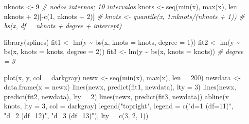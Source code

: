\documentclass[
]{book}
\newenvironment{Shaded}{\begin{snugshade}}{\end{snugshade}}
\newcommand{\AttributeTok}[1]{\textcolor[rgb]{0.77,0.63,0.00}{#1}}
\newcommand{\CommentTok}[1]{\textcolor[rgb]{0.56,0.35,0.01}{\textit{#1}}}
\newcommand{\DecValTok}[1]{\textcolor[rgb]{0.00,0.00,0.81}{#1}}
\newcommand{\FunctionTok}[1]{\textcolor[rgb]{0.00,0.00,0.00}{#1}}
\newcommand{\NormalTok}[1]{#1}
\newcommand{\OtherTok}[1]{\textcolor[rgb]{0.56,0.35,0.01}{#1}}
\newcommand{\SpecialCharTok}[1]{\textcolor[rgb]{0.00,0.00,0.00}{#1}}
\newcommand{\StringTok}[1]{\textcolor[rgb]{0.31,0.60,0.02}{#1}}
\theoremstyle{break}
\theoremstyle{definition}
\theoremstyle{definition}
\theoremstyle{definition}
\theoremstyle{definition}
\theoremstyle{remark}
\begin{document}
\begin{Shaded}
\begin{Highlighting}[]
\NormalTok{nknots }\OtherTok{\textless{}{-}} \DecValTok{9} \CommentTok{\# nodos internos; 10 intervalos}
\NormalTok{knots }\OtherTok{\textless{}{-}} \FunctionTok{seq}\NormalTok{(}\FunctionTok{min}\NormalTok{(x), }\FunctionTok{max}\NormalTok{(x), }\AttributeTok{len =}\NormalTok{ nknots }\SpecialCharTok{+} \DecValTok{2}\NormalTok{)[}\SpecialCharTok{{-}}\FunctionTok{c}\NormalTok{(}\DecValTok{1}\NormalTok{, nknots }\SpecialCharTok{+} \DecValTok{2}\NormalTok{)]}
\CommentTok{\# knots \textless{}{-} quantile(x, 1:nknots/(nknots + 1)) \# bs(x, df = nknots + degree + intercept)}

\FunctionTok{library}\NormalTok{(splines)}
\NormalTok{fit1 }\OtherTok{\textless{}{-}} \FunctionTok{lm}\NormalTok{(y }\SpecialCharTok{\textasciitilde{}} \FunctionTok{bs}\NormalTok{(x, }\AttributeTok{knots =}\NormalTok{ knots, }\AttributeTok{degree =} \DecValTok{1}\NormalTok{))}
\NormalTok{fit2 }\OtherTok{\textless{}{-}} \FunctionTok{lm}\NormalTok{(y }\SpecialCharTok{\textasciitilde{}} \FunctionTok{bs}\NormalTok{(x, }\AttributeTok{knots =}\NormalTok{ knots, }\AttributeTok{degree =} \DecValTok{2}\NormalTok{))}
\NormalTok{fit3 }\OtherTok{\textless{}{-}} \FunctionTok{lm}\NormalTok{(y }\SpecialCharTok{\textasciitilde{}} \FunctionTok{bs}\NormalTok{(x, }\AttributeTok{knots =}\NormalTok{ knots)) }\CommentTok{\# degree = 3}

\FunctionTok{plot}\NormalTok{(x, y, }\AttributeTok{col =} \StringTok{\textquotesingle{}darkgray\textquotesingle{}}\NormalTok{)}
\NormalTok{newx }\OtherTok{\textless{}{-}} \FunctionTok{seq}\NormalTok{(}\FunctionTok{min}\NormalTok{(x), }\FunctionTok{max}\NormalTok{(x), }\AttributeTok{len =} \DecValTok{200}\NormalTok{)}
\NormalTok{newdata }\OtherTok{\textless{}{-}} \FunctionTok{data.frame}\NormalTok{(}\AttributeTok{x =}\NormalTok{ newx)}
\FunctionTok{lines}\NormalTok{(newx, }\FunctionTok{predict}\NormalTok{(fit1, newdata), }\AttributeTok{lty =} \DecValTok{3}\NormalTok{)}
\FunctionTok{lines}\NormalTok{(newx, }\FunctionTok{predict}\NormalTok{(fit2, newdata), }\AttributeTok{lty =} \DecValTok{2}\NormalTok{)}
\FunctionTok{lines}\NormalTok{(newx, }\FunctionTok{predict}\NormalTok{(fit3, newdata))}
\FunctionTok{abline}\NormalTok{(}\AttributeTok{v =}\NormalTok{ knots, }\AttributeTok{lty =} \DecValTok{3}\NormalTok{, }\AttributeTok{col =} \StringTok{\textquotesingle{}darkgray\textquotesingle{}}\NormalTok{)}
\FunctionTok{legend}\NormalTok{(}\StringTok{"topright"}\NormalTok{, }\AttributeTok{legend =} \FunctionTok{c}\NormalTok{(}\StringTok{"d=1 (df=11)"}\NormalTok{, }\StringTok{"d=2 (df=12)"}\NormalTok{, }\StringTok{"d=3 (df=13)"}\NormalTok{), }
       \AttributeTok{lty =} \FunctionTok{c}\NormalTok{(}\DecValTok{3}\NormalTok{, }\DecValTok{2}\NormalTok{, }\DecValTok{1}\NormalTok{))}
\end{Highlighting}
\end{Shaded}
\end{document}

